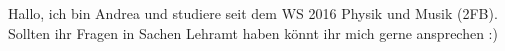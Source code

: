\begin{multicols*}{2}
{Hallo, ich bin Andrea und studiere seit dem WS 2016 Physik und Musik (2FB). Sollten ihr Fragen in Sachen Lehramt haben könnt ihr mich gerne ansprechen :)
\vspace{\baselineskip}
}



\end{multicols*}
